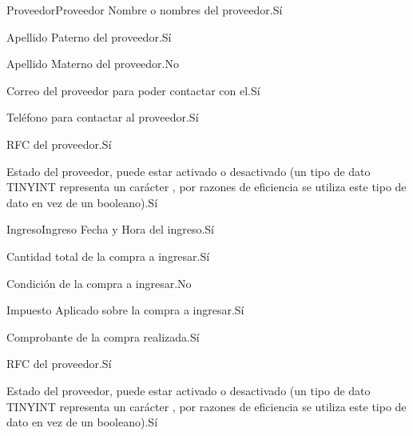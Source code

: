 \begin{cdtEntidad}{Proveedor}{Proveedor}
		{Nombre o nombres del proveedor.}{Sí}
		
		{Apellido Paterno del proveedor.}{Sí}
		
		{Apellido Materno del proveedor.}{No}

		{Correo del proveedor para poder contactar con el.}{Sí}
		
		{Teléfono para contactar al proveedor.}{Sí}
		
		{RFC del proveedor.}{Sí}
	
		{Estado del proveedor, puede estar activado o desactivado (un tipo de dato TINYINT representa un carácter , por razones de eficiencia se utiliza este tipo de dato en vez de un booleano).}{Sí}	
\end{cdtEntidad}


\begin{cdtEntidad}{Ingreso}{Ingreso}
		{Fecha y Hora del ingreso.}{Sí}
		
		{Cantidad total de la compra a ingresar.}{Sí}
		
		{Condición de la compra a ingresar.}{No}

		{Impuesto Aplicado sobre la compra a ingresar.}{Sí}
		
		{Comprobante de la compra realizada.}{Sí}
		
		{RFC del proveedor.}{Sí}
	
		{Estado del proveedor, puede estar activado o desactivado (un tipo de dato TINYINT representa un carácter , por razones de eficiencia se utiliza este tipo de dato en vez de un booleano).}{Sí}	
\end{cdtEntidad}








